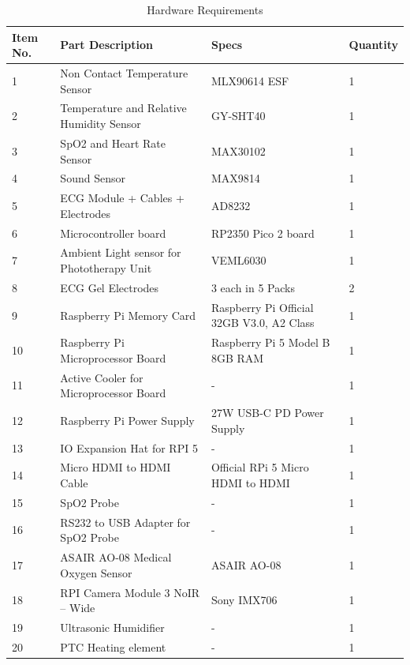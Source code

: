 \documentclass{article}
\begin{document}
\begin{table}[h]
    \centering
    \caption{Hardware Requirements}
    \begin{tabular}{@{}lllp{2cm}@{}}
        \toprule
        \textbf{Item No.} & \textbf{Part Description} & \textbf{Specs} & \textbf{Quantity} \\
        \midrule
        1 & Non Contact Temperature Sensor & MLX90614 ESF & 1 \\
        2 & Temperature and Relative Humidity Sensor & GY-SHT40 & 1 \\
        3 & SpO2 and Heart Rate Sensor & MAX30102 & 1 \\
        4 & Sound Sensor & MAX9814 & 1 \\
        5 & ECG Module + Cables + Electrodes & AD8232 & 1 \\
        6 & Microcontroller board & RP2350 Pico 2 board & 1 \\
        7 & Ambient Light sensor for Phototherapy Unit & VEML6030 & 1 \\
        8 & ECG Gel Electrodes & 3 each in 5 Packs & 2 \\
        9 & Raspberry Pi Memory Card & Raspberry Pi Official 32GB V3.0, A2 Class & 1 \\
        10 & Raspberry Pi Microprocessor Board & Raspberry Pi 5 Model B 8GB RAM & 1 \\
        11 & Active Cooler for Microprocessor Board & - & 1 \\
        12 & Raspberry Pi Power Supply & 27W USB-C PD Power Supply & 1 \\
        13 & IO Expansion Hat for RPI 5 & - & 1 \\
        14 & Micro HDMI to HDMI Cable & Official RPi 5 Micro HDMI to HDMI & 1 \\
        15 & SpO2 Probe & - & 1 \\
        16 & RS232 to USB Adapter for SpO2 Probe & - & 1 \\
        17 & ASAIR AO-08 Medical Oxygen Sensor & ASAIR AO-08 & 1 \\
        18 & RPI Camera Module 3 NoIR – Wide & Sony IMX706 & 1 \\
        19 & Ultrasonic Humidifier & - & 1 \\
        20 & PTC Heating element & - & 1 \\
        \bottomrule
    \end{tabular}
    \label{tab:table2}
\end{table}
\end{document}
